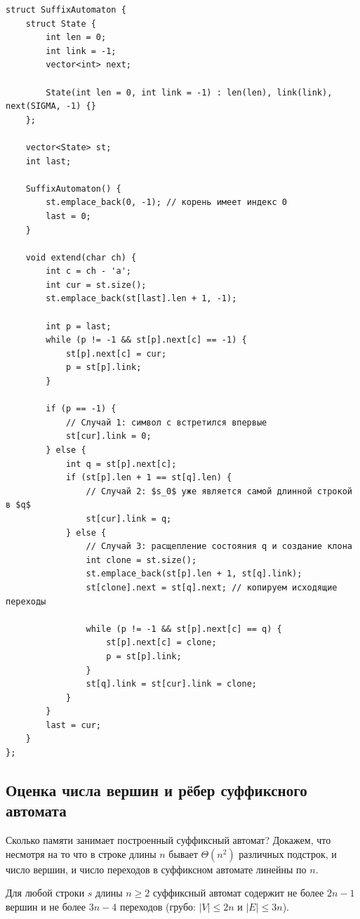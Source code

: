 \begin{lstlisting}[caption={Реализация алгоритма построения суффиксного автомата}]
struct SuffixAutomaton {
    struct State {
        int len = 0;
        int link = -1;
        vector<int> next;

        State(int len = 0, int link = -1) : len(len), link(link), next(SIGMA, -1) {}
    };

    vector<State> st;
    int last;

    SuffixAutomaton() {
        st.emplace_back(0, -1); // корень имеет индекс 0
        last = 0;
    }

    void extend(char ch) {
        int c = ch - 'a';
        int cur = st.size();
        st.emplace_back(st[last].len + 1, -1);

        int p = last;
        while (p != -1 && st[p].next[c] == -1) {
            st[p].next[c] = cur;
            p = st[p].link;
        }

        if (p == -1) {
            // Случай 1: символ c встретился впервые
            st[cur].link = 0;
        } else {
            int q = st[p].next[c];
            if (st[p].len + 1 == st[q].len) {
                // Случай 2: $s_0$ уже является самой длинной строкой в $q$
                st[cur].link = q;
            } else {
                // Случай 3: расщепление состояния q и создание клона
                int clone = st.size();
                st.emplace_back(st[p].len + 1, st[q].link);
                st[clone].next = st[q].next; // копируем исходящие переходы

                while (p != -1 && st[p].next[c] == q) {
                    st[p].next[c] = clone;
                    p = st[p].link;
                }
                st[q].link = st[cur].link = clone;
            }
        }
        last = cur;
    }
};
\end{lstlisting}

\subsection{Оценка числа вершин и рёбер суффиксного автомата}

Сколько памяти занимает построенный суффиксный автомат? Докажем, что несмотря на то что в строке длины $n$ бывает $\Theta(n^2)$ различных подстрок, и число вершин, и число переходов в суффиксном автомате линейны по $n$.

\begin{theorem}\label{thm:sa_size}
    Для любой строки $s$ длины $n \ge 2$ суффиксный автомат содержит не более $2n - 1$ вершин и не более $3n - 4$ переходов (грубо: $|V| \le 2n$ и $|E| \le 3n$).
\end{theorem}

